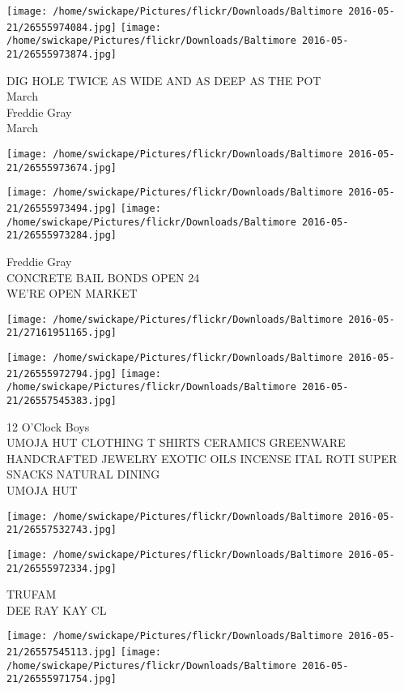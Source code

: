 \documentclass[10pt,letterpaper]{article}
\begin{document}
\texttt{[image: /home/swickape/Pictures/flickr/Downloads/Baltimore 2016-05-21/26555974084.jpg]}
\texttt{[image: /home/swickape/Pictures/flickr/Downloads/Baltimore 2016-05-21/26555973874.jpg]}

DIG HOLE TWICE AS WIDE AND AS DEEP AS THE POT\\
March\\
Freddie Gray\\
March
\pagebreak

\texttt{[image: /home/swickape/Pictures/flickr/Downloads/Baltimore 2016-05-21/26555973674.jpg]}

\vspace{0.25in}
\texttt{[image: /home/swickape/Pictures/flickr/Downloads/Baltimore 2016-05-21/26555973494.jpg]}
\texttt{[image: /home/swickape/Pictures/flickr/Downloads/Baltimore 2016-05-21/26555973284.jpg]}

Freddie Gray\\
CONCRETE BAIL BONDS OPEN 24\\
WE'RE OPEN MARKET
\pagebreak

\texttt{[image: /home/swickape/Pictures/flickr/Downloads/Baltimore 2016-05-21/27161951165.jpg]}

\vspace{0.25in}
\texttt{[image: /home/swickape/Pictures/flickr/Downloads/Baltimore 2016-05-21/26555972794.jpg]}
\texttt{[image: /home/swickape/Pictures/flickr/Downloads/Baltimore 2016-05-21/26557545383.jpg]}

12 O'Clock Boys\\
UMOJA HUT CLOTHING T SHIRTS CERAMICS GREENWARE HANDCRAFTED JEWELRY EXOTIC OILS INCENSE ITAL ROTI SUPER SNACKS NATURAL DINING\\
UMOJA HUT
\pagebreak

\texttt{[image: /home/swickape/Pictures/flickr/Downloads/Baltimore 2016-05-21/26557532743.jpg]}

\vspace{0.25in}
\texttt{[image: /home/swickape/Pictures/flickr/Downloads/Baltimore 2016-05-21/26555972334.jpg]}

TRUFAM\\
DEE RAY KAY CL
\pagebreak

\texttt{[image: /home/swickape/Pictures/flickr/Downloads/Baltimore 2016-05-21/26557545113.jpg]}
\texttt{[image: /home/swickape/Pictures/flickr/Downloads/Baltimore 2016-05-21/26555971754.jpg]}
\end{document}
